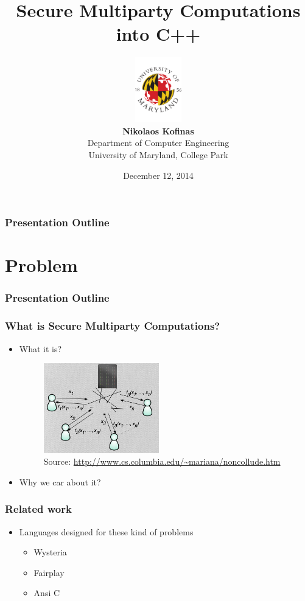 \documentclass{beamer}
\title[SMC and C++]{Secure Multiparty Computations into C++
}
\author[Nikolaos Kofinas]{
\includegraphics[width = 2cm]{informal.pdf}\\
\textbf{Nikolaos Kofinas}\\
Department of Computer Engineering\\
University of Maryland, College Park
\vspace*{-0.8cm}
}
\date{December 12, 2014
\vspace*{-1.2cm}
}
\begin{document}
\frame[plain]{\titlepage
}





\section[Outline]{}
\begin{frame}[fragile]
\frametitle{Presentation Outline}
\tableofcontents
\end{frame}

\section{Problem}

\begin{frame}[fragile]
\frametitle{Presentation Outline}
\tableofcontents[currentsection]
\end{frame}

\begin{frame}
\frametitle{What is Secure Multiparty Computations?}
\begin{itemize}
\item What it is?
\begin{figure}
\includegraphics[width=5cm]{non_collude.png}
\caption{Source:\tiny{ \url{http://www.cs.columbia.edu/~mariana/noncollude.htm}}}
\end{figure}
\item Why we car about it?
\end{itemize}
\end{frame}


\begin{frame}
\frametitle{Related work}
\begin{itemize}
\item Languages designed for these kind of problems
\begin{itemize}
\item Wysteria
\item Fairplay
\item Ansi C
\end{itemize}
\end{itemize}
\end{frame}
\end{document}
